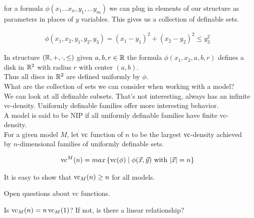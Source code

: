 \documentclass{amsart}
\newcommand{\curly}[1]{\left\{ #1 \right\}}
\begin{document}
\begin{Definition}
	for a formula $\phi(x_1 \ldots x_n, y_1, \ldots y_m)$ we can plug in elements of our structure as parameters in places of $y$ variables. This gives us a collection of definable sets. 
\end{Definition}

\begin{Example}
	\begin{align*}
		\phi(x_1, x_2, y_1, y_2, y_3) = (x_1 - y_1)^2 + (x_2 - y_2)^2 \leq y_3^2
	\end{align*}
\end{Example}

In structure $(\mathbb{R}, +, \cdot, \leq)$ given $a,b,r \in \mathbb{R}$ the formula $\phi(x_1, x_2, a, b, r)$ defines a disk in $\mathbb{R}^2$ with radius $r$ with center $(a,b)$. \\

Thus all discs in $\mathbb{R}^2$ are defined uniformly by $\phi$. \\

What are the collection of sets we can consider when working with a model? \\

We can look at all definable subsets. That's not interesting, always has an infinite vc-density.
Uniformly definable families offer more interesting behavior. \\

A model is said to be NIP if all uniformly definable families have finite vc-density. \\

For a given model $M$, let $\operatorname{vc}$ function of $n$ to be the largest $\operatorname{vc}$-density achieved by $n$-dimensional families of uniformly definable sets.

\begin{align*}
	\vc^M(n) = max \curly{ \vc(\phi) \mid \phi(\vec x, \vec y) \text{ with } |\vec x| = n}
\end{align*}

It is easy to show that $\operatorname{vc}_M(n) \geq n$ for all models.

Open questions about vc functions.

Is $\operatorname{vc}_M(n) = n \operatorname{vc}_M(1)$? If not, is there a linear relationship?
\end{document}
